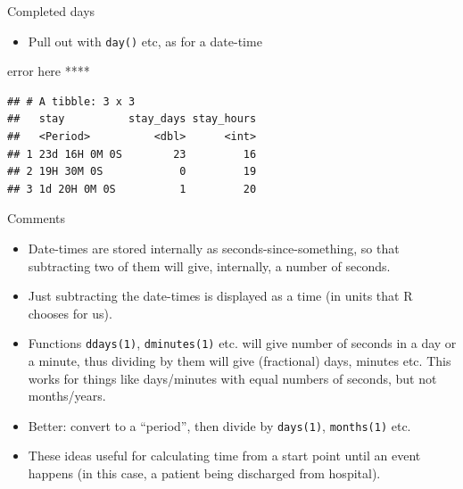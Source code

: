 \documentclass[
  ignorenonframetext,
]{beamer}
\newenvironment{Shaded}{\begin{snugshade}}{\end{snugshade}}
\newcommand{\DataTypeTok}[1]{\textcolor[rgb]{0.13,0.29,0.53}{#1}}
\newcommand{\KeywordTok}[1]{\textcolor[rgb]{0.13,0.29,0.53}{\textbf{#1}}}
\newcommand{\NormalTok}[1]{#1}
\newcommand{\OperatorTok}[1]{\textcolor[rgb]{0.81,0.36,0.00}{\textbf{#1}}}
\newcommand{\StringTok}[1]{\textcolor[rgb]{0.31,0.60,0.02}{#1}}
\providecommand{\tightlist}{%
  \setlength{\itemsep}{0pt}\setlength{\parskip}{0pt}}
\begin{document}
\begin{frame}[fragile]{Completed days}
\protect\hypertarget{completed-days}{}

\begin{itemize}
\tightlist
\item
  Pull out with \texttt{day()} etc, as for a date-time
\end{itemize}

error here ****

\begin{Shaded}
\end{Shaded}

\begin{verbatim}
## # A tibble: 3 x 3
##   stay          stay_days stay_hours
##   <Period>          <dbl>      <int>
## 1 23d 16H 0M 0S        23         16
## 2 19H 30M 0S            0         19
## 3 1d 20H 0M 0S          1         20
\end{verbatim}

\end{frame}

\begin{frame}[fragile]{Comments}
\protect\hypertarget{comments}{}

\begin{itemize}
\tightlist
\item
  Date-times are stored internally as seconds-since-something, so that
  subtracting two of them will give, internally, a number of seconds.
\item
  Just subtracting the date-times is displayed as a time (in units that
  R chooses for us).
\item
  Functions \texttt{ddays(1)}, \texttt{dminutes(1)} etc. will give
  number of seconds in a day or a minute, thus dividing by them will
  give (fractional) days, minutes etc. This works for things like
  days/minutes with equal numbers of seconds, but not months/years.
\item
  Better: convert to a ``period'', then divide by \texttt{days(1)},
  \texttt{months(1)} etc.
\item
  These ideas useful for calculating time from a start point until an
  event happens (in this case, a patient being discharged from
  hospital).
\end{itemize}

\end{frame}
\end{document}
